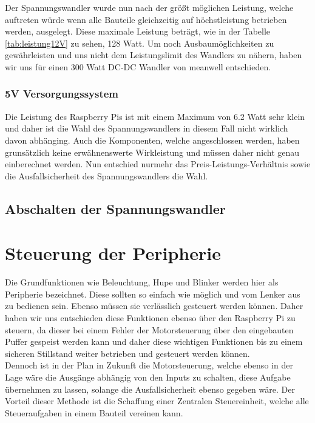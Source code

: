 Der Spannungswandler wurde nun nach der größt möglichen Leistung, welche auftreten würde wenn alle Bauteile gleichzeitig auf höchstleistung betrieben werden, ausgelegt. Diese maximale Leistung beträgt, wie in der Tabelle \ref{tab:leistung12V} zu sehen, 128 Watt. Um noch Ausbaumöglichkeiten zu gewährleisten und uns nicht dem Leistungslimit des Wandlers zu nähern, haben wir uns für einen 300 Watt DC-DC Wandler von meanwell entschieden. 

\subsubsection{5V Versorgungssystem}

Die Leistung des Raspberry Pis ist mit einem Maximum von 6.2 Watt sehr klein und daher ist die Wahl des Spannungswandlers in diesem Fall nicht wirklich davon abhänging. Auch die Komponenten, welche angeschlossen werden, haben grunsätzlich keine erwähnenswerte Wirkleistung und müssen daher nicht genau einberechnet werden. Nun entschied nurmehr das Preis-Leistungs-Verhältnis sowie die Ausfallsicherheit des Spannungswandlers die Wahl.

\subsection{Abschalten der Spannungswandler}


\newpage


\section{Steuerung der Peripherie}

Die Grundfunktionen wie Beleuchtung, Hupe und Blinker werden hier als Peripherie bezeichnet. Diese sollten so einfach wie möglich und vom Lenker aus zu bedienen sein. Ebenso müssen sie verlässlich gesteuert werden können. Daher haben wir uns entschieden diese Funktionen ebenso über den Raspberry Pi zu steuern, da dieser bei einem Fehler der Motorsteuerung über den eingebauten Puffer gespeist werden kann und daher diese wichtigen Funktionen bis zu einem sicheren Stillstand weiter betrieben und gesteuert werden können.\\
Dennoch ist in der Plan in Zukunft die Motorsteuerung, welche ebenso in der Lage wäre die Ausgänge abhängig von den Inputs zu schalten, diese Aufgabe übernehmen zu lassen, solange die Ausfallsicherheit ebenso gegeben wäre. Der Vorteil dieser Methode ist die Schaffung einer Zentralen Steuereinheit, welche alle Steueraufgaben in einem Bauteil vereinen kann.

